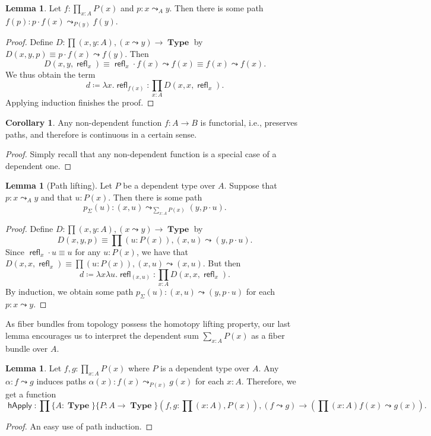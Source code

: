 \documentclass[10pt,letterpaper,cm]{nupset}
\theoremstyle{definition}
\theoremstyle{theorem}
\newtheorem{lemma}[definition]{Lemma}
\newtheorem{corollary}[definition]{Corollary}
\theoremstyle{remark}
\newcommand{\1}{\mathbf{1}}
\newcommand{\0}{\vec 0}
\DeclareMathOperator{\refl}{\mathsf{refl}}
\DeclareMathOperator{\happly}{\mathsf{hApply}}
\DeclareMathOperator{\type}{\mathbf{Type}}
\begin{document}
\begin{lemma}
Let $f: \prod_{x:A}P(x)$ and $p: x\leadsto_A y$. Then there is some path $f(p):p \cdot f(x) \leadsto_{P(y)} f(y)$.
\end{lemma}
\begin{proof}
Define $D: \prod (x,y:A), (x\leadsto y) \to \type$ by  $D(x,y,p) \equiv p\cdot f(x) \leadsto f(y)$. Then $$D(x,y,\refl_x) \equiv \refl_x \cdot f(x) \leadsto f(x) \equiv f(x) \leadsto f(x).$$ We thus obtain the term $$ d\coloneqq \lambda x.\refl_{f(x)}: \prod_{x:A}D(x,x,\refl_x).$$ Applying induction finishes the proof.
\end{proof}

\begin{corollary}
Any non-dependent function $f: A \to B$ is functorial, i.e., preserves paths, and therefore is continuous in a certain sense.
\end{corollary}
\begin{proof}
Simply recall that any non-dependent function is a special case of a dependent one.
\end{proof}



\begin{lemma}[Path lifting]
Let $P$ be a dependent type over $A$. Suppose that $p: x\leadsto_A y$ and that $u: P(x)$. Then there is some path $$p_{\Sigma}(u) : (x, u) \leadsto_{\sum_{x:A}P(x)} (y, p\cdot u).$$
\end{lemma}
\begin{proof}
Define $D: \prod (x,y:A), (x\leadsto y) \to \type$ by  $$D(x,y,p) \equiv \prod(u:P(x)), (x,u) \leadsto (y, p\cdot u).$$ Since $\refl_x \cdot u \equiv u$ for any $u: P(x)$, we have that $D(x, x, \refl_x) \equiv \prod (u:P(x)), (x,u) \leadsto (x,u)$. But then $$ d\coloneqq\lambda x\lambda u. \refl_{(x,u)} : \prod_{x:A} D(x,x, \refl_x) .$$ By induction, we obtain some path $p_{\Sigma}(u) : (x,u)\leadsto (y, p \cdot u)$ for each $p: x\leadsto y$.
\end{proof}

As fiber bundles from topology possess the homotopy lifting property,  our last lemma encourages us to interpret the dependent sum $\sum_{x:A}P(x)$ as a fiber bundle over $A$.

\begin{lemma}
Let $f,g: \prod_{x:A} P(x)$ where $P$ is a dependent type over $A$. Any $\alpha : f \leadsto g$ induces paths $\alpha(x) :f(x) \leadsto_{P(x)} g(x)$ for each $x:A$. Therefore, we get a function $$\happly : \prod \{A :\type\}\{P: A \to \type\}(f,g: \prod(x:A), P(x)), (f\leadsto g) \to \left(\prod(x:A) f(x)\leadsto g(x) \right).$$
\end{lemma}
\begin{proof}
An easy use of path induction.
\end{proof}
\end{document}
